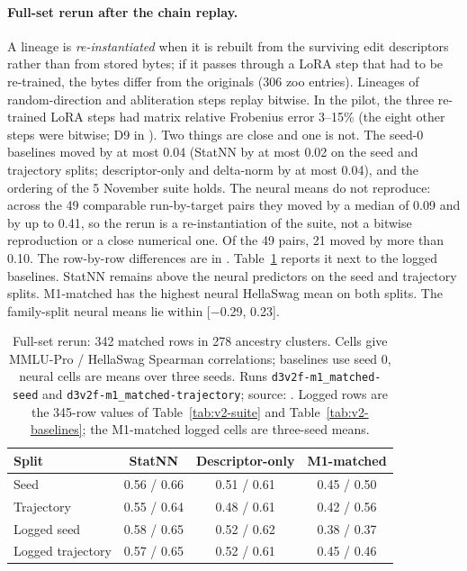 \paragraph{Full-set rerun after the chain replay.} A lineage is \emph{re-instantiated} when it is rebuilt from the surviving edit descriptors rather than from stored bytes; if it passes through a LoRA step that had to be re-trained, the bytes differ from the originals (306 zoo entries). Lineages of random-direction and abliteration steps replay bitwise. In the pilot, the three re-trained LoRA steps had matrix relative Frobenius error 3--15\% (the eight other steps were bitwise; D9 in ). Two things are close and one is not. The seed-0 baselines moved by at most 0.04 (StatNN by at most 0.02 on the seed and trajectory splits; descriptor-only and delta-norm by at most 0.04), and the ordering of the 5 November suite holds. The neural means do not reproduce: across the 49 comparable run-by-target pairs they moved by a median of 0.09 and by up to 0.41, so the rerun is a re-instantiation of the suite, not a bitwise reproduction or a close numerical one. Of the 49 pairs, 21 moved by more than 0.10. The row-by-row differences are in . Table~\ref{tab:d8-full} reports it next to the logged baselines. StatNN remains above the neural predictors on the seed and trajectory splits. M1-matched has the highest neural HellaSwag mean on both splits. The family-split neural means lie within [$-$0.29, 0.23].
\begin{table}[t]
\centering
\small
\begin{tabular}{lccc}\toprule
Split & StatNN & Descriptor-only & M1-matched \\\midrule
Seed & 0.56 / 0.66 & 0.51 / 0.61 & 0.45 / 0.50 \\
Trajectory & 0.55 / 0.64 & 0.48 / 0.61 & 0.42 / 0.56 \\
Logged seed & 0.58 / 0.65 & 0.52 / 0.62 & 0.38 / 0.37 \\
Logged trajectory & 0.57 / 0.65 & 0.52 / 0.61 & 0.45 / 0.46 \\\bottomrule
\end{tabular}
\caption{Full-set rerun: 342 matched rows in 278 ancestry clusters. Cells give MMLU-Pro / HellaSwag Spearman correlations; baselines use seed 0, neural cells are means over three seeds. Runs \texttt{d3v2f-m1\_matched-seed} and \texttt{d3v2f-m1\_matched-trajectory}; source: \protect{}. Logged rows are the 345-row values of Table~\ref{tab:v2-suite} and Table~\ref{tab:v2-baselines}; the M1-matched logged cells are three-seed means.}
\label{tab:d8-full}
\end{table}

